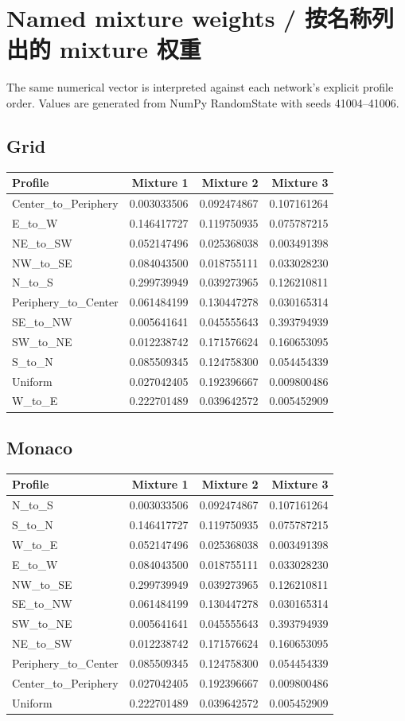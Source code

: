\section*{Named mixture weights / 按名称列出的 mixture 权重}
The same numerical vector is interpreted against each network's explicit profile order. Values are generated from NumPy RandomState with seeds 41004--41006.
\subsection*{Grid}
\begin{longtable}{@{}lrrr@{}}
\toprule
Profile & Mixture 1 & Mixture 2 & Mixture 3 \\
\midrule
Center\_to\_Periphery & 0.003033506 & 0.092474867 & 0.107161264 \\
E\_to\_W & 0.146417727 & 0.119750935 & 0.075787215 \\
NE\_to\_SW & 0.052147496 & 0.025368038 & 0.003491398 \\
NW\_to\_SE & 0.084043500 & 0.018755111 & 0.033028230 \\
N\_to\_S & 0.299739949 & 0.039273965 & 0.126210811 \\
Periphery\_to\_Center & 0.061484199 & 0.130447278 & 0.030165314 \\
SE\_to\_NW & 0.005641641 & 0.045555643 & 0.393794939 \\
SW\_to\_NE & 0.012238742 & 0.171576624 & 0.160653095 \\
S\_to\_N & 0.085509345 & 0.124758300 & 0.054454339 \\
Uniform & 0.027042405 & 0.192396667 & 0.009800486 \\
W\_to\_E & 0.222701489 & 0.039642572 & 0.005452909 \\
\bottomrule
\end{longtable}
\subsection*{Monaco}
\begin{longtable}{@{}lrrr@{}}
\toprule
Profile & Mixture 1 & Mixture 2 & Mixture 3 \\
\midrule
N\_to\_S & 0.003033506 & 0.092474867 & 0.107161264 \\
S\_to\_N & 0.146417727 & 0.119750935 & 0.075787215 \\
W\_to\_E & 0.052147496 & 0.025368038 & 0.003491398 \\
E\_to\_W & 0.084043500 & 0.018755111 & 0.033028230 \\
NW\_to\_SE & 0.299739949 & 0.039273965 & 0.126210811 \\
SE\_to\_NW & 0.061484199 & 0.130447278 & 0.030165314 \\
SW\_to\_NE & 0.005641641 & 0.045555643 & 0.393794939 \\
NE\_to\_SW & 0.012238742 & 0.171576624 & 0.160653095 \\
Periphery\_to\_Center & 0.085509345 & 0.124758300 & 0.054454339 \\
Center\_to\_Periphery & 0.027042405 & 0.192396667 & 0.009800486 \\
Uniform & 0.222701489 & 0.039642572 & 0.005452909 \\
\bottomrule
\end{longtable}
